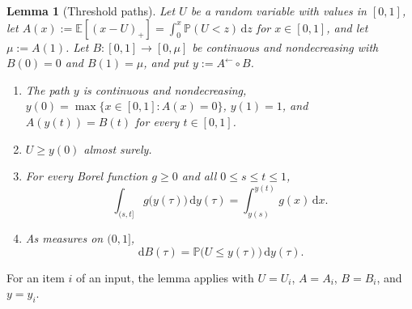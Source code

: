 \documentclass[11pt]{article}
\newtheorem{lemma}[theorem]{Lemma}
\theoremstyle{definition}
\theoremstyle{remark}
\newcommand{\Pp}{\mathbb P}
\newcommand{\E}{\mathbb E}
\newcommand{\dd}{\,\mathrm d}
\begin{document}
\begin{lemma}[Threshold paths]\label{lem:threshold-paths}
Let $U$ be a random variable with values in $[0,1]$, let $A(x):=\E[(x-U)_+]=\int_0^x\Pp(U<z)\dd z$ for $x\in[0,1]$, and let $\mu:=A(1)$.
Let $B:[0,1]\to[0,\mu]$ be continuous and nondecreasing with $B(0)=0$ and $B(1)=\mu$, and put $y:=A^\leftarrow\circ B$.
\begin{enumerate}
\item[(a)] The path $y$ is continuous and nondecreasing, $y(0)=\max\{x\in[0,1]:A(x)=0\}$, $y(1)=1$, and $A(y(t))=B(t)$ for every $t\in[0,1]$.
\item[(b)] $U\ge y(0)$ almost surely.
\item[(c)] For every Borel function $g\ge0$ and all $0\le s\le t\le1$,
\begin{equation}\label{eq:stieltjes-substitution}
 \int_{(s,t]}g\bigl(y(\tau)\bigr)\dd y(\tau)=\int_{y(s)}^{y(t)}g(x)\dd x.
\end{equation}
\item[(d)] As measures on $(0,1]$,
\begin{equation}\label{eq:chain}
 \dd B(\tau)=\Pp\bigl(U\le y(\tau)\bigr)\dd y(\tau).
\end{equation}
\end{enumerate}
\end{lemma}

For an item $i$ of an input, the lemma applies with $U=U_i$, $A=A_i$, $B=B_i$, and $y=y_i$.
\end{document}
